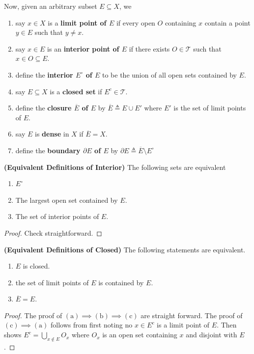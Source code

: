 \documentclass{report}
\begin{document}
\begin{mdframed}
Now, given an arbitrary subset $E\subseteq X$, we 
\begin{enumerate}[label=(\alph*)]
  \item say $x\in X$ is a \textbf{limit point of $E$} if every open $O$ containing $x$ contain a point $y\in E$ such that $y \neq x$.
  \item say $x\in E$ is an \textbf{interior point of $E$} if there exists $O\in \mathscr{T }$ such that $x \in O \subseteq E$.
  \item define the \textbf{interior $E^\circ $ of $E$} to be the union of all open sets contained by  $E$.
   \item say $E\subseteq X$ is a \textbf{closed set} if $E^c \in \mathscr{T }$.
   \item define the \textbf{closure $\overline{E}$ of $E$} by $\overline{E}\triangleq E\cup E'$ where $E'$ is the set of limit points of $E$. 
    \item say $E$ is \textbf{dense} in $X$ if  $\overline{E}=X$.
    \item define the \textbf{boundary $\partial E$ of $E$} by $\partial E\triangleq \overline{E}\setminus E^\circ $
\end{enumerate}
\end{mdframed}
\begin{theorem}
\textbf{(Equivalent Definitions of Interior)} The following sets are equivalent
\begin{enumerate}[label=(\alph*)]
  \item $E^\circ $
  \item The largest open set contained by $E$.
  \item The set of interior points of $E$.
\end{enumerate}
\end{theorem}
\begin{proof}
Check straightforward.
\end{proof}
\begin{theorem}
\textbf{(Equivalent Definitions of Closed)} The following statements are equivalent.
\begin{enumerate}[label=(\alph*)]
  \item $E$ is closed.
  \item the set of limit points of $E$ is contained by $E$.
  \item $\overline{E}=E$.
\end{enumerate}
\end{theorem}
\begin{proof}
The proof of $(\text{a})\implies (\text{b})\implies (\text{c})$ are straight forward. The proof of $(\text{c})\implies (\text{a})$ follows from first noting no  $x\in E^c$ is a limit point of $E$. Then shows $E^c = \bigcup_{x \not \in E}O_x$ where $O_x$ is an open set containing $x$ and disjoint with $E$.
\end{proof}
\end{document}
